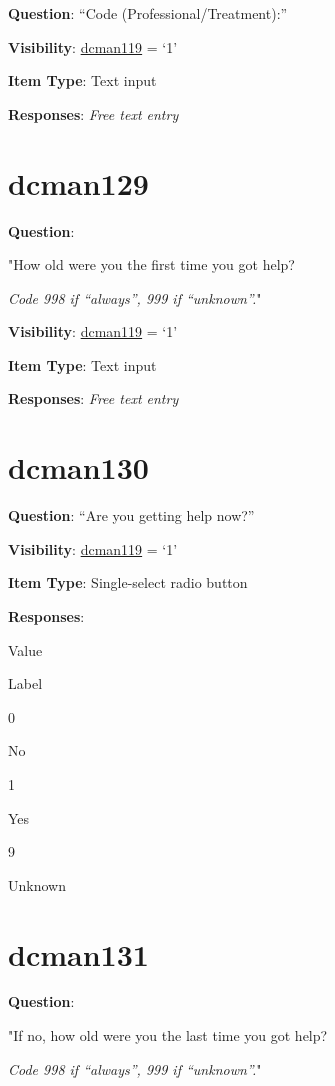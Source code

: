 \documentclass[]{book}
\begin{document}
\textbf{Question}: ``Code (Professional/Treatment):''

\textbf{Visibility}: \protect\hyperlink{dcman119}{dcman119} = `1'

\textbf{Item Type}: Text input

\textbf{Responses}: \emph{Free text entry}

\hypertarget{dcman129}{%
\section{dcman129}\label{dcman129}}

\textbf{Question}:

"How old were you the first time you got help?

\emph{Code 998 if ``always'', 999 if ``unknown''.}"

\textbf{Visibility}: \protect\hyperlink{dcman119}{dcman119} = `1'

\textbf{Item Type}: Text input

\textbf{Responses}: \emph{Free text entry}

\hypertarget{dcman130}{%
\section{dcman130}\label{dcman130}}

\textbf{Question}: ``Are you getting help now?''

\textbf{Visibility}: \protect\hyperlink{dcman119}{dcman119} = `1'

\textbf{Item Type}: Single-select radio button

\textbf{Responses}:

Value

Label

0

No

1

Yes

9

Unknown

\hypertarget{dcman131}{%
\section{dcman131}\label{dcman131}}

\textbf{Question}:

"If no, how old were you the last time you got help?

\emph{Code 998 if ``always'', 999 if ``unknown''.}"
\end{document}
